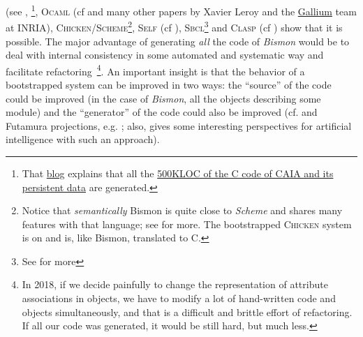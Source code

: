       {\small (see \cite{Pitrat:2000:machine-intelligence, Pitrat:2009:AST, Pitrat:2009:ArtifBeings},  \cite{Pitrat:blog}\footnote{That \href{http://bootstrappingartificialintelligence.fr/WordPress3/}{blog} explains that all the
        \href{http://starynkevitch.net/Basile/caia-su-24feb2016.tar.bz2}{500KLOC of the C code of CAIA and its persistent data} are generated.}, \textsc{Ocaml}
       {\small (cf \cite{Ocaml,
          Leroy-modular-modules} and many other papers by Xavier Leroy
        and the \href{http://gallium.inria.fr/}{Gallium} team at
        INRIA)},   \textsc{Chicken/Scheme}\footnote{Notice that
        \emph{semantically}  Bismon is quite close to \emph{Scheme} and
        shares many features with that language; see
        for more. The  bootstrapped \textsc{Chicken}  system is on
         and is, like Bismon,
        translated to C.}, \textsc{Self} 
            {\small (cf \cite{Ungar:1987:Self})},
            \textsc{Sbcl}\footnote{See  for
              more}  and \textsc{Clasp}
             {\small (cf
              \cite{Schafmeister:2015:CLASP})} show that it is
            possible. The major advantage of generating \emph{all} the
            code of \emph{Bismon} would be to deal with internal
            consistency in some automated and systematic way and
            facilitate refactoring~\footnote{In 2018, if we decide
              painfully to change the representation of attribute
              associations in objects, we have to modify a lot of
              hand-written code and objects simultaneously, and that
              is a difficult and brittle effort of refactoring. If all
              our code was generated, it would be still hard, but much
              less.}. An important insight is that the behavior of a
            bootstrapped  system can be improved in
            two ways: the ``source'' of the code could be improved (in
            the case of \emph{Bismon}, all the objects describing some
            module) and the ``generator'' of the code could also be
            improved (cf.  and Futamura  projections,
            e.g. \cite{Futamura:1999:PartialEval}; also,
            \cite{Pitrat:2009:ArtifBeings, Pitrat:blog} gives some
            interesting perspectives for artificial intelligence with
            such an approach).

}
